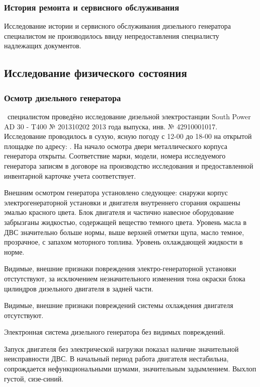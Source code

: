 \subsubsection{История ремонта и сервисного обслуживания}

Исследование истории и сервисного обслуживания дизельного генератора специалистом не производилось ввиду непредоставления специалисту надлежащих документов.



\subsection{Исследование физического состояния }

\subsubsection{Осмотр дизельного генератора}

\osm\, специалистом проведёно исследование  	дизельной электростанции South Power AD 30 - T400  № 201310202 2013 года выпуска, инв. № 42910001017. Исследование  проводилось в сухую, ясную погоду с 12-00  до 18-00 на открытой площадке   по адресу: .   На начало осмотра двери металлического корпуса генератора открыты.  Соответствие марки, модели,  номера  исследуемого генератора записям в договоре на производство исследования и предоставленной инвентарной карточке учета соответствует.


Внешним осмотром генератора установлено следующее: снаружи корпус  электрогенераторной установки и  двигателя внутреннего  сгорания окрашены эмалью красного цвета. Блок двигателя и частично навесное оборудование забрызганы жидкостью, содержащей   вещество темного цвета.     Уровень масла в ДВС значительно больше нормы, выше верхней отметки щупа, масло темное, прозрачное, с запахом моторного топлива.  Уровень охлаждающей жидкости в норме.  

Видимые, внешние признаки повреждения электро-генераторной установки отстутствуют, за исключением незначительного изменения тона окраски блока цилиндров дизельного двигателя в задней части.

Видимые, внешние признаки повреждений системы охлаждения двигателя отсутствуют.

Электронная система дизельного генератора без видимых повреждений.


Запуск двигателя без электрической нагрузки показал наличие  значительной неисправности ДВС.  В начальный период работа двигателя нестабильна, сопрождается нефункциональными шумами, значительным задымлением. Выхлоп густой, сизе-синий. 

